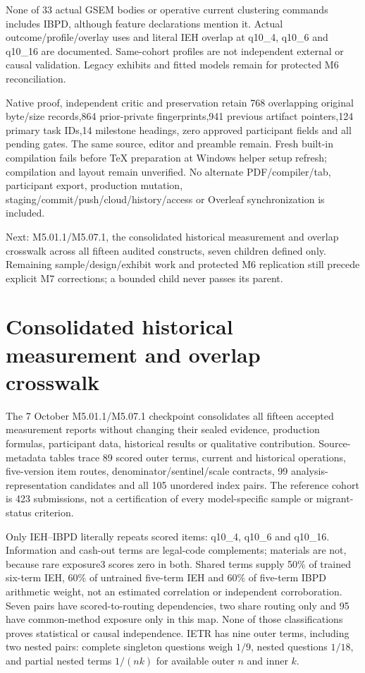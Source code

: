 \documentclass[11pt,a4paper]{article}
\begin{document}
None of 33 actual GSEM bodies or operative current clustering commands
includes IBPD, although feature declarations mention it.
Actual outcome/profile/overlay uses and literal IEH overlap at
q10\_4, q10\_6 and q10\_16 are documented. Same-cohort profiles are not
independent external or causal validation. Legacy exhibits and fitted
models remain for protected M6 reconciliation.

Native proof, independent critic and preservation retain 768 overlapping
original byte/size records,864 prior-private fingerprints,941 previous
artifact pointers,124 primary task IDs,14 milestone headings, zero approved
participant fields and all pending gates. The same source, editor and
preamble remain. Fresh built-in compilation fails before TeX preparation
at Windows helper setup refresh; compilation and layout remain unverified.
No alternate PDF/compiler/tab, participant export,
production mutation, staging/commit/push/cloud/history/access or Overleaf
synchronization is included.

Next: M5.01.1/M5.07.1, the consolidated historical measurement and overlap
crosswalk across all fifteen audited constructs, seven children defined only.
Remaining sample/design/exhibit work and protected M6 replication still
precede explicit M7 corrections; a bounded child never passes its parent.

\section{Consolidated historical measurement and overlap crosswalk}

The 7 October M5.01.1/M5.07.1 checkpoint consolidates all fifteen accepted
measurement reports without changing their sealed evidence, production
formulas, participant data, historical results or qualitative contribution.
Source-metadata tables trace 89 scored outer terms, current and historical
operations, five-version item routes, denominator/sentinel/scale contracts,
99 analysis-representation candidates and all 105 unordered index pairs.
The reference cohort is 423 submissions, not a certification of every
model-specific sample or migrant-status criterion.

Only IEH--IBPD literally repeats scored items: q10\_4, q10\_6 and q10\_16.
Information and cash-out terms are legal-code complements; materials are
not, because rare exposure3 scores zero in both. Shared terms supply
50\% of trained six-term IEH, 60\% of untrained five-term IEH and 60\%
of five-term IBPD arithmetic weight, not an estimated correlation or
independent corroboration. Seven pairs have scored-to-routing dependencies,
two share routing only and 95 have common-method exposure only in this map.
None of those classifications proves statistical or causal independence.
IETR has nine outer terms, including two nested pairs: complete singleton
questions weigh $1/9$, nested questions $1/18$, and partial nested terms
$1/(n k)$ for available outer $n$ and inner $k$.
\end{document}
